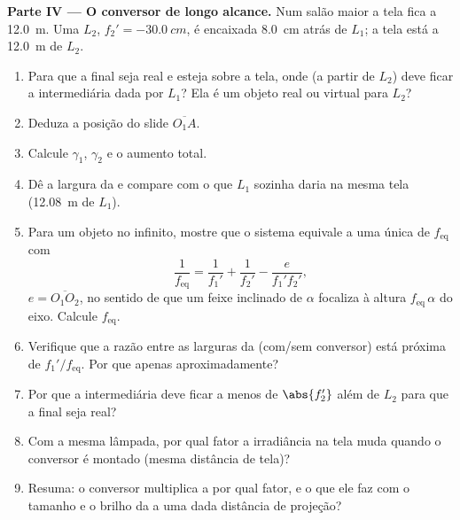 \begin{problem}
\medskip
\noindent\textbf{Parte IV --- O conversor de longo alcance.}
Num salão maior a tela fica a \qty{12.0}{m}. Uma 
$L_2$, $f_2' = \qty{-30.0}{cm}$, é encaixada \qty{8.0}{cm} atrás de
$L_1$; a tela está a \qty{12.0}{m} de $L_2$.
\begin{enumerate}[resume]
  \item Para que a  final seja real e esteja sobre a tela, onde (a partir de
        $L_2$) deve ficar a  intermediária dada por $L_1$? Ela é um
        objeto real ou virtual para $L_2$?
  \item Deduza a posição do slide $\overline{O_1A}$.
  \item Calcule $\gamma_1$, $\gamma_2$ e o aumento total.
  \item Dê a largura da  e compare com o que $L_1$ sozinha daria
        na mesma tela (\qty{12.08}{m} de $L_1$).
  \item Para um objeto no infinito, mostre que o sistema equivale
        a uma única  de  $f_{\mathrm{eq}}$ com
        \[
        \frac{1}{f_{\mathrm{eq}}} = \frac{1}{f_1'} + \frac{1}{f_2'} - \frac{e}{f_1' f_2'},
        \]
        $e = \overline{O_1O_2}$, no sentido de que um feixe inclinado de
        $\alpha$ focaliza à altura $f_{\mathrm{eq}}\,\alpha$ do
        eixo. Calcule $f_{\mathrm{eq}}$.
  \item Verifique que a razão entre as larguras da  (com/sem conversor)
        está próxima de $f_1'/f_{\mathrm{eq}}$. Por que apenas aproximadamente?
  \item Por que a  intermediária deve ficar a menos de $\abs{f_2'}$
        além de $L_2$ para que a  final seja real?
  \item Com a mesma lâmpada, por qual fator a irradiância na tela
        muda quando o conversor é montado (mesma distância de tela)?
  \item Resuma: o conversor multiplica a  por qual
        fator, e o que ele faz com o tamanho e o brilho da  a uma
        dada distância de projeção?
\end{enumerate}
\end{problem}
